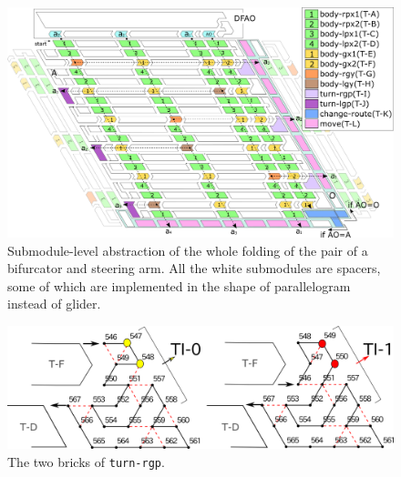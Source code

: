 \documentclass[dvipdfmx,review]{elsarticle}
\begin{document}
\begin{figure}[tb]
\centering
\includegraphics[width=\linewidth]{Figs/overall_turn_part.png}
\caption{Submodule-level abstraction of the whole folding of the pair of a bifurcator and steering arm. 
All the white submodules are spacers, some of which are implemented in the shape of parallelogram instead of glider.}
\label{fig:turner}
\end{figure}

\begin{figure}[h]
\centering
\includegraphics[width=\linewidth]{Figs/turn-rgp.png}
\caption{The two bricks of \texttt{turn-rgp}.}
\label{fig:turn-rgp}
\end{figure}
\end{document}
